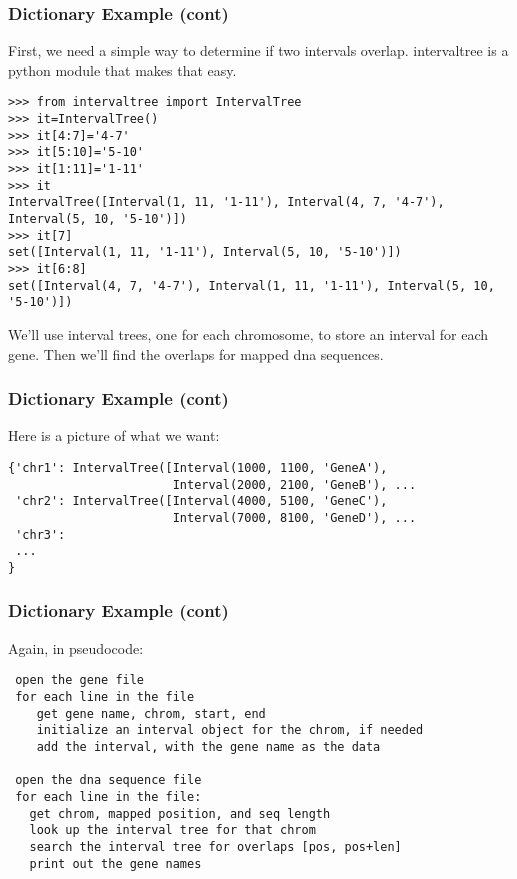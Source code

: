 \documentclass[10pt]{beamer}
\newcommand\smallfont{\fontsize{8pt}{7.2}\selectfont}
\begin{document}
\begin{frame}[fragile]
\frametitle{Dictionary Example (cont)}

First, we need a simple way to determine if two intervals overlap.  
intervaltree is a python module that makes that easy.

\smallfont
\begin{verbatim}
>>> from intervaltree import IntervalTree
>>> it=IntervalTree()
>>> it[4:7]='4-7'
>>> it[5:10]='5-10'
>>> it[1:11]='1-11'
>>> it
IntervalTree([Interval(1, 11, '1-11'), Interval(4, 7, '4-7'), Interval(5, 10, '5-10')])
>>> it[7]
set([Interval(1, 11, '1-11'), Interval(5, 10, '5-10')])
>>> it[6:8]
set([Interval(4, 7, '4-7'), Interval(1, 11, '1-11'), Interval(5, 10, '5-10')]) 
\end{verbatim}

We'll use interval trees, one for each chromosome, to store an interval for each gene.
Then we'll find the overlaps for mapped dna sequences.

\end{frame}

\begin{frame}[fragile]
\frametitle{Dictionary Example (cont)}

Here is a picture of what we want:

\smallfont
\begin{verbatim}
{'chr1': IntervalTree([Interval(1000, 1100, 'GeneA'), 
                       Interval(2000, 2100, 'GeneB'), ...
 'chr2': IntervalTree([Interval(4000, 5100, 'GeneC'), 
                       Interval(7000, 8100, 'GeneD'), ...
 'chr3':
 ...
}
\end{verbatim}

\end{frame}


\begin{frame}[fragile]
\frametitle{Dictionary Example (cont)}
\smallfont
Again, in pseudocode:
\begin{verbatim}
 open the gene file
 for each line in the file
    get gene name, chrom, start, end
    initialize an interval object for the chrom, if needed
    add the interval, with the gene name as the data

 open the dna sequence file
 for each line in the file:
   get chrom, mapped position, and seq length
   look up the interval tree for that chrom
   search the interval tree for overlaps [pos, pos+len]
   print out the gene names

\end{verbatim}
\end{frame}
\end{document}

